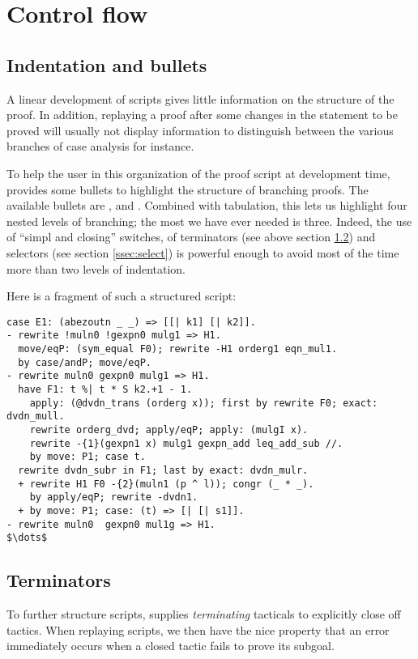 \section{Control flow}
\subsection{Indentation and bullets}\label{ssec:indent}

A linear development of \Coq{} scripts gives little information on
the structure of the proof. In addition, replaying a proof after some
changes in the statement to be proved will usually not display information to
distinguish between the various branches of case analysis for instance.

To help the user in this organization of the proof script at
development time, \ssr{} provides some bullets to highlight the
structure of branching proofs. The available bullets are \C{-},
\C{+} and \C{*}. Combined with tabulation, this lets us highlight four
nested levels of branching; the most we have ever
needed is three. Indeed, the use of ``simpl and closing'' switches, of
terminators (see above section \ref{ssec:termin}) and selectors (see
 section \ref{ssec:select}) is powerful enough
to avoid most of the time more than two levels of indentation.

Here is a fragment of such a structured script:

\begin{lstlisting}
case E1: (abezoutn _ _) => [[| k1] [| k2]].
- rewrite !muln0 !gexpn0 mulg1 => H1.
  move/eqP: (sym_equal F0); rewrite -H1 orderg1 eqn_mul1.
  by case/andP; move/eqP.
- rewrite muln0 gexpn0 mulg1 => H1.
  have F1: t %| t * S k2.+1 - 1.
    apply: (@dvdn_trans (orderg x)); first by rewrite F0; exact: dvdn_mull.
    rewrite orderg_dvd; apply/eqP; apply: (mulgI x).
    rewrite -{1}(gexpn1 x) mulg1 gexpn_add leq_add_sub //.
    by move: P1; case t.
  rewrite dvdn_subr in F1; last by exact: dvdn_mulr.
  + rewrite H1 F0 -{2}(muln1 (p ^ l)); congr (_ * _).
    by apply/eqP; rewrite -dvdn1.
  + by move: P1; case: (t) => [| [| s1]].
- rewrite muln0  gexpn0 mul1g => H1.
$\dots$
\end{lstlisting}

\subsection{Terminators}\label{ssec:termin}
To further structure scripts, \ssr{}
supplies \emph{terminating} tacticals to explicitly close off tactics.
When replaying scripts, we then have the nice property that
an error immediately occurs when a closed tactic fails to prove its
subgoal.

